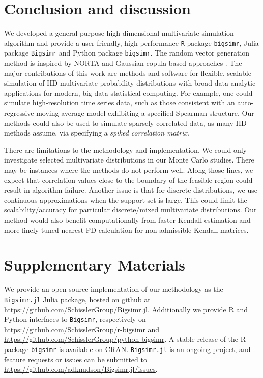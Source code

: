 \documentclass[
]{jss}
\begin{document}
\hypertarget{discussion}{%
\section{Conclusion and discussion}\label{discussion}}

We developed a general-purpose high-dimensional multivariate simulation algorithm and provide a user-friendly, high-performance \texttt{R} package \texttt{bigsimr}, Julia package \texttt{Bigsimr} and Python package \texttt{bigsimr}. The random vector generation method is inspired by NORTA \citep{Cario1997} and Gaussian copula-based approaches \citep[\citet{BF17}, \citet{Xia17}]{MB13}. The major contributions of this work are methods and software for flexible, scalable simulation of HD multivariate probability distributions with broad data analytic applications for modern, big-data statistical computing. For example, one could simulate high-resolution time series data, such as those consistent with an auto-regressive moving average model exhibiting a specified Spearman structure. Our methods could also be used to simulate sparsely correlated data, as many HD methods assume, via specifying a \emph{spiked correlation matrix}.

There are limitations to the methodology and implementation. We could only investigate selected multivariate distributions in our Monte Carlo studies. There may be instances where the methods do not perform well. Along those lines, we expect that correlation values close to the boundary of the feasible region could result in algorithm failure. Another issue is that for discrete distributions, we use continuous approximations when the support set is large. This could limit the scalability/accuracy for particular discrete/mixed multivariate distributions. Our method would also benefit computationally from faster Kendall estimation and more finely tuned nearest PD calculation for non-admissible Kendall matrices.

\hypertarget{misc}{%
\section*{Supplementary Materials}\label{misc}}

We provide an open-source implementation of our methodology as the \texttt{Bigsimr.jl} Julia package, hosted on github at \url{https://github.com/SchisslerGroup/Bigsimr.jl}. Additionally we provide R and Python interfaces to \texttt{Bigsimr}, respectively on \url{https://github.com/SchisslerGroup/r-bigsimr} and \url{https://github.com/SchisslerGroup/python-bigsimr}. A stable release of the R package \texttt{bigsimr} is available on CRAN. \texttt{Bigsimr.jl} is an ongoing project, and feature requests or issues can be submitted to \url{https://github.com/adknudson/Bigsimr.jl/issues}.
\end{document}

